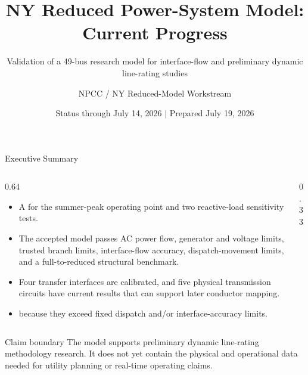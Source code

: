 \documentclass[aspectratio=169,10pt]{beamer}
\title[NY Reduced Model Progress]{NY Reduced Power-System Model:\\Current Progress}
\subtitle{Validation of a 49-bus research model for interface-flow and preliminary dynamic line-rating studies}
\author{NPCC / NY Reduced-Model Workstream}
\date{Status through July 14, 2026 \quad $\vert$ \quad Prepared July 19, 2026}
\begin{document}

\begin{frame}{Executive Summary}
\small
\begin{columns}[T,onlytextwidth]
\begin{column}{0.64\linewidth}
\begin{itemize}
  \item A  for the summer-peak operating point and two reactive-load sensitivity tests.
  \item The accepted model passes AC power flow, generator and voltage limits, trusted branch limits, interface-flow accuracy, dispatch-movement limits, and a full-to-reduced structural benchmark.
  \item Four transfer interfaces are calibrated, and five physical transmission circuits have current results that can support later conductor mapping.
  \item {} because they exceed fixed dispatch and/or interface-accuracy limits.
\end{itemize}
\end{column}
\begin{column}{0.33\linewidth}
\vspace{0.35em}
\vspace{0.35em}
\end{column}
\end{columns}

\begin{alertblock}{Claim boundary}
{\scriptsize The model supports preliminary dynamic line-rating methodology research. It does not yet contain the physical and operational data needed for utility planning or real-time operating claims.}
\end{alertblock}
\vspace{-0.24cm}
\end{frame}
\end{document}
